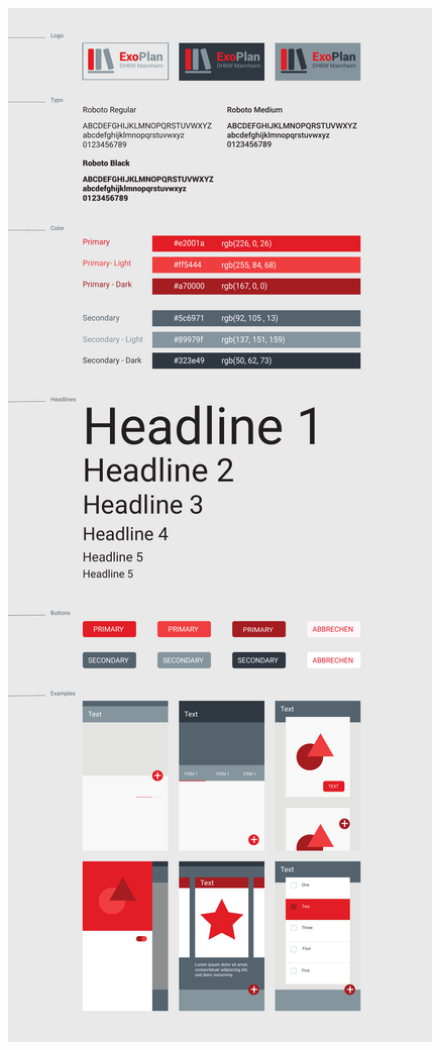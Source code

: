 \begin{figure}[H]
	\centering 
	\includegraphics[page=2, width=12.5cm ]{docs/StyleguideEx.pdf}
\end{figure}




